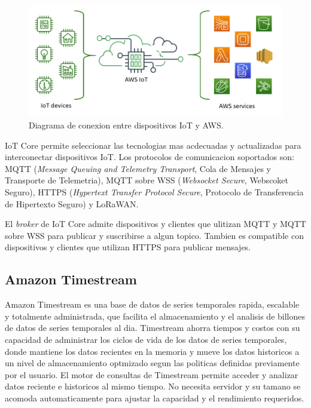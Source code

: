 \begin{figure}[h]
	\centering
	\includegraphics[scale=0.5]{./Figures/aws_iot.png}
	\caption{Diagrama de conexion entre dispositivos IoT y AWS.}
	\label{fig:aws_iot}
\end{figure}

IoT Core permite seleccionar las tecnologias mas acdecuadas y actualizadas para interconectar dispositivos IoT. Los protocolos de comunicacion soportados son: MQTT (\textit{Message Queuing and Telemetry Transport}, Cola de Mensajes y Transporte de Telemetria), MQTT sobre WSS (\textit{Websocket Secure}, Webscoket Seguro), HTTPS (\textit{Hypertext Transfer Protocol Secure}, Protocolo de Transferencia de Hipertexto Seguro) y LoRaWAN.

El \textit{broker} de IoT Core admite dispositivos y clientes que ulitizan MQTT y MQTT sobre WSS para publicar y suscribirse a algun topico. Tambien es compatible con dispositivos y clientes que utilizan HTTPS para publicar mensajes.

\subsection{Amazon Timestream}
Amazon Timestream es una base de datos de series temporales rapida, escalable y totalmente administrada, que facilita el almacenamiento y el analisis de billones de datos de series temporales al dia. Timestream ahorra tiempos y costos con su capacidad de administrar los ciclos de vida de los datos de series temporales, donde mantiene los datos recientes en la memoria y mueve los datos historicos a un nivel de almacenamiento optmizado segun las politicas definidas previamente por el usuario. El motor de consultas de Timestream permite acceder y analizar datos reciente e historicos al mismo tiempo. No necesita servidor y su tamano se acomoda automaticamente para ajustar la capacidad y el rendimiento requeridos. 

